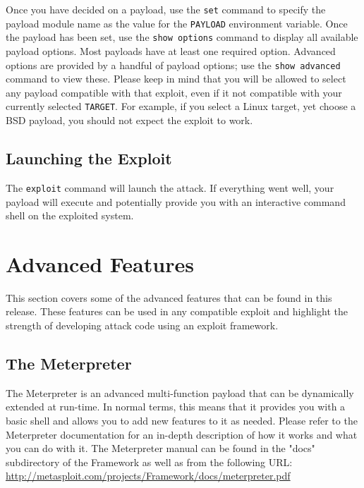 \documentclass{report}
\begin{document}
\par
Once you have decided on a payload, use the \texttt{set} command to specify the payload
module name as the value for the \texttt{PAYLOAD} environment variable. Once the payload
has been set, use the \texttt{show options} command to display all available payload
options. Most payloads have at least one required option. Advanced options are
provided by a handful of payload options; use the \texttt{show advanced} command to view
these. Please keep in mind that you will be allowed to select any payload
compatible with that exploit, even if it not compatible with your currently
selected \texttt{TARGET}. For example, if you select a Linux target, yet choose
a BSD payload, you should not expect the exploit to work.


	\section{Launching the Exploit}
\par
The \texttt{exploit} command will launch the attack. If everything went well, your
payload will execute and potentially provide you with an interactive command
shell on the exploited system. 


\pagebreak
\chapter{Advanced Features}

\par
This section covers some of the advanced features that can be found in this
release. These features can be used in any compatible exploit and highlight the
strength of developing attack code using an exploit framework. 

\section{The Meterpreter}
\par
The Meterpreter is an advanced multi-function payload that can be dynamically
extended at run-time. In normal terms, this means that it provides you with a
basic shell and allows you to add new features to it as needed. Please refer to
the Meterpreter documentation for an in-depth description of how it works and
what you can do with it. The Meterpreter manual can be found in the "docs"
subdirectory of the Framework as well as from the following URL:
\url{http://metasploit.com/projects/Framework/docs/meterpreter.pdf}
\end{document}
